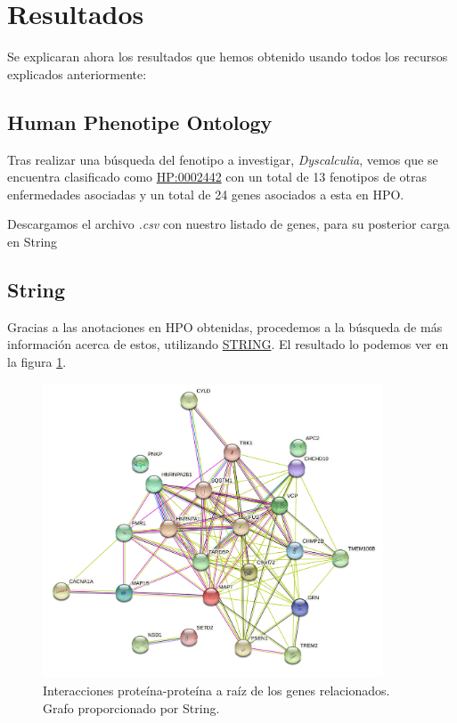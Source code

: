 

\section{Resultados}

Se explicaran ahora los resultados que hemos obtenido usando todos los recursos explicados anteriormente:

\subsection{Human Phenotipe Ontology}

\hfill

Tras realizar una búsqueda del fenotipo a investigar, \textit{Dyscalculia}, vemos que se encuentra clasificado como \href{https://hpo.jax.org/app/browse/term/HP:0002442}{HP:0002442} con un total de 13 fenotipos de otras enfermedades asociadas y un total de 24 genes asociados a esta en HPO.

Descargamos el archivo \textit{.csv} con nuestro listado de genes, para su posterior carga en String

\subsection{String}

\hfill

Gracias a las anotaciones en HPO obtenidas, procedemos a la búsqueda de más información acerca de estos, utilizando \href{https://string-db.org}{STRING}. El resultado lo podemos ver en la figura \ref{fig:string1}.

\begin{figure}[h]
	\centering
	\includegraphics[width=0.90\textwidth]{figures/Gene_Relationship.png}
	\caption{Interacciones proteína-proteína a raíz de los genes relacionados. Grafo proporcionado por String.}
	\label{fig:string1}
\end{figure}

